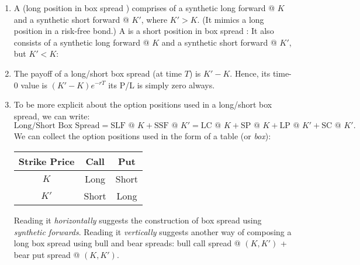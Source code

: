 \begin{enumerate}
\item A  (long position in box spread ) comprises
of a synthetic long forward @ \(K\) and a synthetic short forward @ \(K'\),
where \(K'>K\). (It mimics a long position in a risk-free bond.) A  is a short position in box spread : It also consists of
a synthetic long forward @ \(K\) and a synthetic short forward @ \(K'\), but
\(K'<K\):
\begin{center}
\end{center}

\item The payoff of a long/short box spread (at time \(T\)) is \(K'-K\). Hence,
its time-0 value is \((K'-K)e^{-rT}\)  its P/L is simply
zero always.

\item To be more explicit about the option positions used in a long/short box
spread, we can write:
\[
\text{Long/Short Box Spread} 
= \text{SLF @ \(K\)} + \text{SSF @ \(K'\)} 
= \text{LC @ \(K\)} + \text{SP @ \(K\)} + \text{LP @ \(K'\)} + \text{SC @ \(K'\)}.
\]
We can collect the option positions used in the form of a table (or
\emph{box}):
\begin{center}
\begin{tabular}{ccc}
\toprule
Strike Price&Call&Put\\
\midrule
\(K\)&Long&Short\\
\(K'\)&Short&Long\\
\bottomrule
\end{tabular}
\end{center}
Reading it \emph{horizontally} suggests the construction of box spread using
\emph{synthetic forwards}. Reading it \emph{vertically} suggests another way of
composing a long box spread using bull and bear spreads: bull call spread
@ \((K,K')\) + bear put spread @ \((K,K')\).


\end{enumerate}
